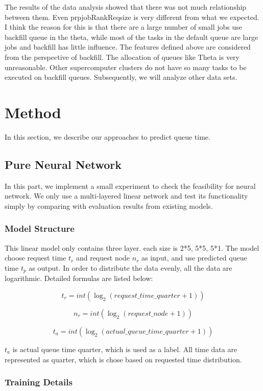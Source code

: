 \documentclass[conference,compsoc]{IEEEtran}
\begin{document}
The results of the data analysis showed that there was not much relationship between them. Even prpjobRankReqsize is very different from what we expected. I think the reason for this is that there are a large number of small jobs use backfill queue in the theta, while most of the tasks in the default queue are large jobs and backfill has little influence. The features defined above are considered from the perspective of backfill. The allocation of queues like Theta is very unreasonable. Other supercomputer clusters do not have so many tasks to be executed on backfill queues. Subsequently, we will analyze other data sets.

\section{Method}

In this section, we describe our approaches to predict queue time.

\subsection{Pure Neural Network}

In this part, we implement a small experiment to check the feasibility for neural network. We only use a multi-layered linear network and test its functionality simply by comparing with evaluation results from existing models.

\subsubsection{Model Structure}

This linear model only contains three layer. each size is 2*5, 5*5, 5*1. The model choose request time $t_r$ and request node $n_r$ as input, and use predicted queue time $t_p$ as output. In order to distribute the data evenly, all the data are logarithmic. Detailed formulas are listed below:

$$t_r = int(\log_2(request\_time\_quarter+1))$$

$$n_r = int(\log_2(request\_node+1))$$

$$t_a = int(\log_2(actual\_queue\_time\_quarter+1))$$


$t_a$ is actual queue time quarter, which is used as a label. All time data are represented as quarter, which is chose based on requested time distribution.

\subsubsection{Training Details}
\end{document}
